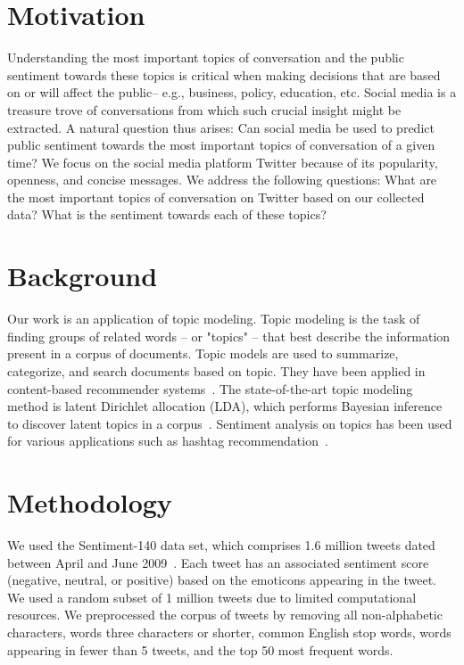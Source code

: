 \documentclass{sig-alternate-05-2015}
\begin{document}
\maketitle


\section{Motivation}

Understanding the most important topics of conversation and the public sentiment towards these topics is critical when making decisions that are based on or will affect the public-- e.g., business, policy, education, etc.
%
Social media is a treasure trove of conversations from which such crucial insight might be extracted. A natural question thus arises: Can social media be used to predict public sentiment towards the most important topics of conversation of a given time? 
%
We focus on the social media platform Twitter because of its popularity, openness, and concise messages. We address the following questions: What are the most important topics of conversation on Twitter based on our collected data? What is the sentiment towards each of these topics?

\section{Background}

Our work is an application of topic modeling.
%
Topic modeling is the task of finding groups of related words -- or "topics" -- that best describe the information present in a corpus of documents.
%
Topic models are used to summarize, categorize, and search documents based on topic. They have been applied in content-based recommender systems~\cite{wilson2014improving}.
%
The state-of-the-art topic modeling method is latent Dirichlet allocation (LDA), which performs Bayesian inference to discover latent topics in a corpus~\cite{blei2003latent}.
%
Sentiment analysis on topics has been used for various applications such as hashtag recommendation~\cite{she2014tomoha}.

\section{Methodology}

We used the Sentiment-140 data set, which comprises 1.6 million tweets dated between April and June 2009~\cite{kaggle}. Each tweet has an associated sentiment score (negative, neutral, or positive) based on the emoticons appearing in the tweet.
%
We used a random subset of 1 million tweets due to limited computational resources.
%
We preprocessed the corpus of tweets by removing all non-alphabetic characters, words three characters or shorter, common English stop words, words appearing in fewer than 5 tweets, and the top 50 most frequent words.
\end{document}
